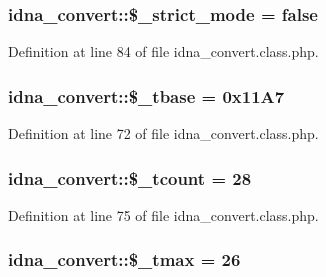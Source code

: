 \subsubsection[{\$\+\_\+strict\+\_\+mode}]{\setlength{\rightskip}{0pt plus 5cm}idna\+\_\+convert\+::\$\+\_\+strict\+\_\+mode = false\hspace{0.3cm}{\ttfamily [protected]}}\label{classidna__convert_a6457ade57cb55c7b44bfbf8686c2c2d5}


Definition at line 84 of file idna\+\_\+convert.\+class.\+php.

\hypertarget{classidna__convert_a5b728e6ff6e15773c914383a66651826}{}
\subsubsection[{\$\+\_\+tbase}]{\setlength{\rightskip}{0pt plus 5cm}idna\+\_\+convert\+::\$\+\_\+tbase = 0x11\+A7\hspace{0.3cm}{\ttfamily [protected]}}\label{classidna__convert_a5b728e6ff6e15773c914383a66651826}


Definition at line 72 of file idna\+\_\+convert.\+class.\+php.

\hypertarget{classidna__convert_a81a70a95e18fde08ec6633f0095c92c6}{}
\subsubsection[{\$\+\_\+tcount}]{\setlength{\rightskip}{0pt plus 5cm}idna\+\_\+convert\+::\$\+\_\+tcount = 28\hspace{0.3cm}{\ttfamily [protected]}}\label{classidna__convert_a81a70a95e18fde08ec6633f0095c92c6}


Definition at line 75 of file idna\+\_\+convert.\+class.\+php.

\hypertarget{classidna__convert_a44dfb166546f087150aa6c1ffdde2473}{}
\subsubsection[{\$\+\_\+tmax}]{\setlength{\rightskip}{0pt plus 5cm}idna\+\_\+convert\+::\$\+\_\+tmax = 26\hspace{0.3cm}{\ttfamily [protected]}}\label{classidna__convert_a44dfb166546f087150aa6c1ffdde2473}


